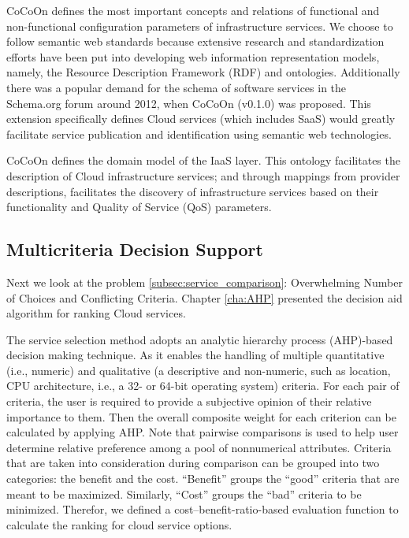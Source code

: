 CoCoOn defines the most important concepts and
relations of functional and non-functional
configuration parameters of infrastructure services.
We choose to follow semantic web standards because extensive research
and standardization efforts have been put into developing web
information representation models, namely, the Resource
Description Framework (RDF) and ontologies. 
Additionally there was a popular demand for the schema of
software services in the Schema.org forum around 2012, when
CoCoOn (v0.1.0) was proposed. 
This extension specifically defines Cloud services (which
includes SaaS) would greatly facilitate service publication
and identification using semantic web technologies.

CoCoOn defines the domain model of the IaaS layer. 
This ontology facilitates the description of Cloud infrastructure services; 
and through mappings from provider descriptions, facilitates the
discovery of infrastructure services based on their
functionality and Quality of Service (QoS) parameters. 


\subsection{Multicriteria Decision Support}
Next we look at the problem \ref{subsec:service_comparison}:
Overwhelming Number of Choices and Conflicting Criteria.
Chapter \ref{cha:AHP} presented the decision aid algorithm for ranking Cloud services.

The service selection method adopts an analytic hierarchy process (AHP)-based decision making technique. As it enables the handling of multiple quantitative (i.e., numeric) and qualitative (a descriptive and
non-numeric, such as location, CPU architecture, i.e., a 32- or
64-bit operating system) criteria. For each pair of
criteria, the user is required to provide a subjective
opinion of their relative importance to them.
Then the overall composite weight for each criterion can be calculated by applying AHP.
Note that pairwise comparisons \cite{PairwiseComparison} is used to help user determine relative preference among a pool of nonnumerical attributes.
Criteria that are taken into consideration during comparison can be grouped into two
categories: the benefit and the cost. “Benefit” groups the “good” criteria
that are meant to be maximized. Similarly, “Cost” groups the “bad” criteria to
be minimized. Therefor, we defined a cost–benefit-ratio-based evaluation function to 
calculate the ranking for cloud service options.

